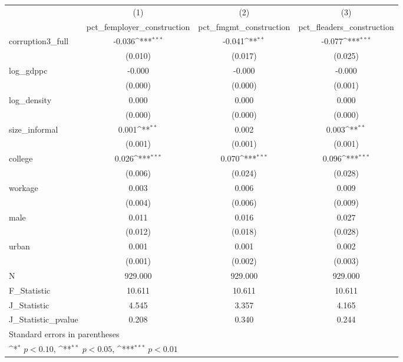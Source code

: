 {
\def\sym#1{\ifmmode^{#1}\else\(^{#1}\)\fi}
\begin{tabular}{l*{3}{c}}
\hline\hline
            &\multicolumn{1}{c}{(1)}&\multicolumn{1}{c}{(2)}&\multicolumn{1}{c}{(3)}\\
            &\multicolumn{1}{c}{pct\_femployer\_construction}&\multicolumn{1}{c}{pct\_fmgmt\_construction}&\multicolumn{1}{c}{pct\_fleaders\_construction}\\
\hline
corruption3\_full&      -0.036\sym{***}&      -0.041\sym{**} &      -0.077\sym{***}\\
            &     (0.010)         &     (0.017)         &     (0.025)         \\
[1em]
log\_gdppc   &      -0.000         &      -0.000         &      -0.000         \\
            &     (0.000)         &     (0.000)         &     (0.001)         \\
[1em]
log\_density &       0.000         &       0.000         &       0.000         \\
            &     (0.000)         &     (0.000)         &     (0.000)         \\
[1em]
size\_informal&       0.001\sym{**} &       0.002         &       0.003\sym{**} \\
            &     (0.001)         &     (0.001)         &     (0.001)         \\
[1em]
college     &       0.026\sym{***}&       0.070\sym{***}&       0.096\sym{***}\\
            &     (0.006)         &     (0.024)         &     (0.028)         \\
[1em]
workage     &       0.003         &       0.006         &       0.009         \\
            &     (0.004)         &     (0.006)         &     (0.009)         \\
[1em]
male        &       0.011         &       0.016         &       0.027         \\
            &     (0.012)         &     (0.018)         &     (0.028)         \\
[1em]
urban       &       0.001         &       0.001         &       0.002         \\
            &     (0.001)         &     (0.002)         &     (0.003)         \\
\hline
N           &     929.000         &     929.000         &     929.000         \\
F\_Statistic &      10.611         &      10.611         &      10.611         \\
J\_Statistic &       4.545         &       3.357         &       4.165         \\
J\_Statistic\_pvalue&       0.208         &       0.340         &       0.244         \\
\hline\hline
\multicolumn{4}{l}{\footnotesize Standard errors in parentheses}\\
\multicolumn{4}{l}{\footnotesize \sym{*} \(p<0.10\), \sym{**} \(p<0.05\), \sym{***} \(p<0.01\)}\\
\end{tabular}
}

